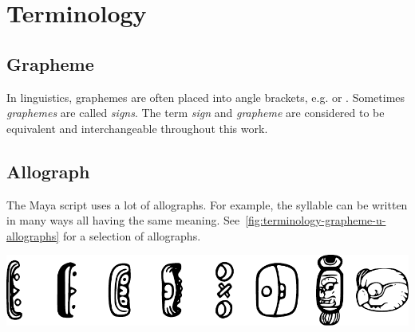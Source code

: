 \documentclass[../main.tex]{subfiles}
\begin{document}
\chapter{Terminology}

\section{Grapheme}
In linguistics, graphemes are often placed into angle brackets, e.g.  or .
Sometimes \emph{graphemes} are called \emph{signs}.
The term \emph{sign} and \emph{grapheme} are considered to be equivalent and 
interchangeable throughout this work.

\section{Allograph}
The Maya script uses a lot of allographs.
For example, the syllable  can be written in many ways all having the same meaning.
See~\ref{fig:terminology-grapheme-u-allographs} for a selection of allographs.
\begin{center}
    \includegraphics[width=\textwidth,keepaspectratio]{img/grapheme-u-allographs}
    \label{fig:terminology-grapheme-u-allographs}
\end{center}
\end{document}

